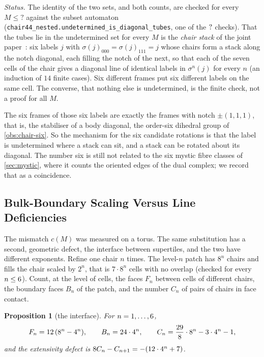 \documentclass[11pt,a4paper]{article}
\newcommand{\SSChTubeM}{?}\newcommand{\SSChTubeOverlap}{?}
\theoremstyle{plain}
\newtheorem{proposition}{Proposition}
\theoremstyle{definition}
\begin{document}
\noindent
\emph{Status.} The identity of the two sets, and both counts, are checked for every
$M\le\SSChTubeM$ against the subset automaton (\texttt{chair44\_nested.undetermined\_is\_diagonal\_tubes},
one of the $?{}$ checks). That the tubes lie in the undetermined set for every $M$ is
the \emph{chair stack} of the joint paper~\cite{HartshornRomanov}: six labels $j$ with
$\sigma(j)_{000}=\sigma(j)_{111}=j$ whose chairs form a stack along the notch diagonal, each
filling the notch of the next, so that each of the seven cells of the chair gives a diagonal
line of identical labels in $\sigma^n(j)$ for every $n$ (an induction of $14$ finite cases). Six different frames put six different labels on
the same cell. The converse, that nothing else is undetermined, is the finite check, not a
proof for all $M$.

The six frames of those six labels are exactly the frames with notch $\pm(1,1,1)$, that is,
the stabiliser of a body diagonal, the order-six dihedral group of
\cref{obs:chair-six}. So the mechanism for the six candidate rotations is that the label is
undetermined where a stack can sit, and a stack can be rotated about its diagonal. The number
six is still not related to the six mystic fibre classes of \cref{sec:mystic}, where it counts
the oriented edges of the dual complex; we record that as a coincidence.

\subsection{Bulk-Boundary Scaling Versus Line Deficiencies}
\label{sec:chair-defects}

The mismatch $c(M)$ was measured on a torus. The same substitution has a second, geometric
defect, the interface between supertiles, and the two have different exponents. Refine one
chair $n$ times. The level-$n$ patch has $8^n$ chairs and fills the chair scaled by $2^n$, that is $7\cdot8^n$
cells with no overlap (checked for every $n\le6{}$). Count, at the level of cells, the faces
$F_n$ between cells of different chairs, the boundary faces $B_n$ of the patch, and the number
$C_n$ of pairs of chairs in face contact.

\begin{proposition}[the interface]
\label{prop:chair-interface}
For $n=1,\dots,6{}$,
\[
F_n=12\,(8^n-4^n),\qquad B_n=24\cdot4^n,\qquad
C_n=\frac{29}{8}\cdot8^n-3\cdot4^n-1,
\]
and the extensivity defect is $8C_n-C_{n+1}=-(12\cdot4^n+7)$.
\end{proposition}
\end{document}
